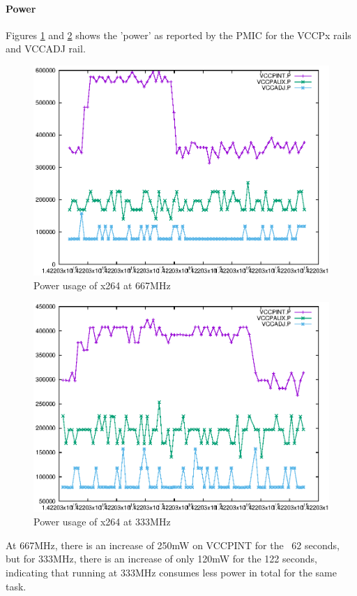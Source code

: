 \documentclass[a4paper]{article}
\begin{document}
  \paragraph{Power}
    Figures \ref{fig:x264:pow:667} and \ref{fig:x264:pow:333} shows the 'power' as reported by the PMIC for the VCCPx rails and VCCADJ rail.
    \begin{figure}[p]
      \includegraphics[width=\textwidth]{data/fig/x264:pow:667.eps}
      \caption{Power usage of x264 at 667MHz}
      \label{fig:x264:pow:667}
    \end{figure}
    \begin{figure}[p]
      \includegraphics[width=\textwidth]{data/fig/x264:pow:333.eps}
      \caption{Power usage of x264 at 333MHz}
      \label{fig:x264:pow:333}
    \end{figure}
    At 667MHz, there is an increase of 250mW on VCCPINT for the ~62 seconds, but for 333MHz, there is an increase of only 120mW for the 122 seconds, indicating that running at 333MHz consumes less power in total for the same task.
\end{document}
